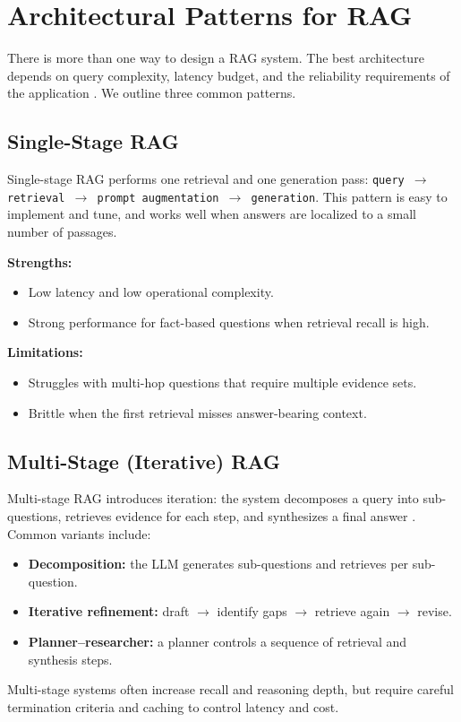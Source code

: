 \section{Architectural Patterns for RAG}
\label{sec:rag-architectural-patterns-for-rag}
There is more than one way to design a RAG system. The best architecture depends on query complexity, latency budget, and the reliability requirements of the application \cite{Lewis2020RAG,Izacard2020Fusion}. We outline three common patterns.

\subsection{Single-Stage RAG}
Single-stage RAG performs one retrieval and one generation pass:
\texttt{query $\rightarrow$ retrieval $\rightarrow$ prompt augmentation $\rightarrow$ generation}.
This pattern is easy to implement and tune, and works well when answers are localized to a small number of passages.

\textbf{Strengths:}  
\begin{itemize}
    \item Low latency and low operational complexity.
    \item Strong performance for fact-based questions when retrieval recall is high.
\end{itemize}

\textbf{Limitations:}  
\begin{itemize}
    \item Struggles with multi-hop questions that require multiple evidence sets.
    \item Brittle when the first retrieval misses answer-bearing context.
\end{itemize}

\subsection{Multi-Stage (Iterative) RAG}
Multi-stage RAG introduces iteration: the system decomposes a query into sub-questions, retrieves evidence for each step, and synthesizes a final answer \cite{Asai2020MultiHop,Nakano2021WebGPT}. Common variants include:
\begin{itemize}
    \item \textbf{Decomposition:} the LLM generates sub-questions and retrieves per sub-question.
    \item \textbf{Iterative refinement:} draft $\rightarrow$ identify gaps $\rightarrow$ retrieve again $\rightarrow$ revise.
    \item \textbf{Planner--researcher:} a planner controls a sequence of retrieval and synthesis steps.
\end{itemize}
Multi-stage systems often increase recall and reasoning depth, but require careful termination criteria and caching to control latency and cost.

